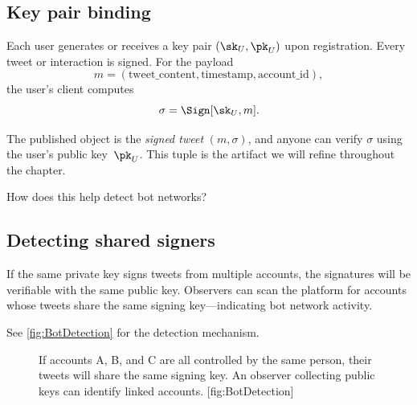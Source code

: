 \subsection{Key pair binding}

Each user generates or receives a key pair \((\sk_U, \pk_U)\) upon
registration.
Every tweet or interaction is signed.
For the payload
\[
  m = (\text{tweet\_content}, \text{timestamp}, \text{account\_id}),
\]
the user's client computes
\[
  \sigma = \Sign[\sk_U, m].
\]

The published object is the \emph{signed tweet} \((m, \sigma)\),
and anyone can verify \(\sigma\) using the user's public key~\(\pk_U\).
This tuple is the artifact we will refine throughout the chapter.

\begin{exercise}
  How does this help detect bot networks?
\end{exercise}

\subsection{Detecting shared signers}

If the same private key signs tweets from multiple accounts, the
signatures will be verifiable with the same public key.
Observers can scan the platform for accounts whose tweets share the same
signing key---indicating bot network activity.

See \cref{fig:BotDetection} for the detection mechanism.

\begin{figure}
  \begin{sidecaption}{%
    If accounts A, B, and C are all controlled by the same person,
    their tweets will share the same signing key.
    An observer collecting public keys can identify linked accounts.
  }[fig:BotDetection]
  \centering
  \end{sidecaption}
\end{figure}


